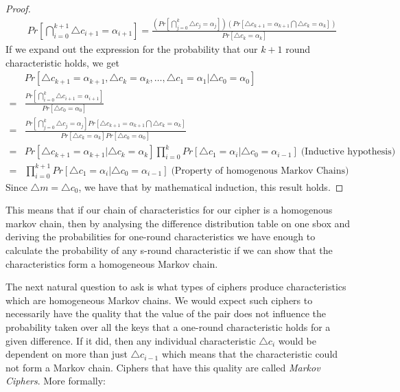 \documentclass[12pt,a4paper]{article}
\begin{document}
\begin{proof}
\begin{align*}
 &Pr[\bigcap^{k+1}_{i=0}\triangle c_{i+1} = \alpha_{i+1}] =
 \frac{(Pr[\bigcap_{j=0}^k \triangle c_j =
 \alpha_j])(Pr[\triangle c_{k+1} = \alpha_{k+1} \bigcap \triangle c_{k} =
 \alpha_k])}{Pr[\triangle c_k = \alpha_k]}
\end{align*}
If we expand out the expression for the probability that our $k+1$ round
characteristic holds, we get
\begin{align*}
&Pr[\triangle c_{k+1} = \alpha_{k+1}, \triangle c_{k} = \alpha_{k},
\ldots,\triangle c_1 = \alpha_1 | \triangle c_0 = \alpha_0]\\ 
=& \frac{Pr[\bigcap^{k}_{i=0} \triangle c_{i+1} = \alpha_{i+1}]}{Pr[\triangle
c_0 = \alpha_0]}\\
=& \frac{Pr[\bigcap_{j=0}^k \triangle c_j =
 \alpha_j]Pr[ \triangle c_{k+1} = \alpha_{k+1} \bigcap \triangle  c_{k} = \alpha_k]}{Pr[\triangle c_k =
 \alpha_k]Pr[\triangle c_0 = \alpha_0]} \\
 =& Pr[\triangle c_{k+1} = \alpha_{k+1}| \triangle c_k = \alpha_k]
 \prod_{i=0}^{k} Pr[\triangle c_1 = \alpha_i | \triangle c_0 = \alpha_{i-1}] \;
 \mbox{(Inductive hypothesis)} \\
 =& \prod_{i=0}^{k+1} Pr[\triangle c_1 = \alpha_i | \triangle c_0 =
 \alpha_{i-1}]\;
 \mbox{(Property of homogenous Markov Chains)}
\end{align*}
Since $\triangle m = \triangle c_0$, we have that by mathematical induction, this result holds.
\end{proof}

This means that if our chain of characteristics for our cipher is a homogenous
markov chain, then by analysing the difference distribution
table on one sbox and deriving the probabilities for one-round characteristics
we have enough to calculate the probability of any s-round characteristic if we
can show that the characteristics form a homogeneous Markov chain. 

The next natural question to ask is what types of ciphers produce
characteristics which are homogeneous Markov chains. We would expect such
ciphers to necessarily have the quality that the value of the pair does not
influence the probability taken over all the keys that a one-round
characteristic holds for a given difference. If it did, then any individual
characteristic $\triangle c_i$ would be dependent on more than just $\triangle
c_{i-1}$ which means that the characteristic could not form a Markov chain.
Ciphers that have this quality are called \textit{Markov Ciphers}. More
formally:
\end{document}
